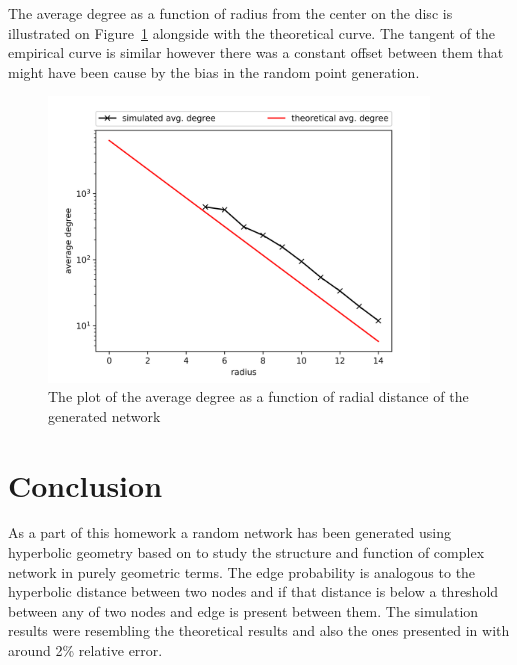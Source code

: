 \documentclass[a4paper]{article}
\begin{document}
The average degree as a function of radius from the center on the disc is illustrated on Figure~\ref{fig:graph_radius} alongside with the theoretical curve. The tangent of the empirical curve is similar however there was a constant offset between them that might have been cause by the bias in the random point generation.

\begin{figure}[H]
    \centering
    \includegraphics[width=0.9\textwidth]{figures/result_graph_radial_stats.png}
    \caption{The plot of the average degree as a function of radial distance of the generated network}
    \label{fig:graph_radius}
\end{figure}




\section{Conclusion}

As a part of this homework a random network has been generated using  hyperbolic geometry based on \cite{HyperbolicGeoNetworks} to study the
structure and function of complex network in purely geometric terms. The edge probability is analogous to the hyperbolic distance between two nodes and if that distance is below a threshold between 
any of two nodes and edge is present between them.
The simulation results were resembling the theoretical results and also the ones presented in \cite{HyperbolicGeoNetworks} with around 2\% relative error.




\end{document}
